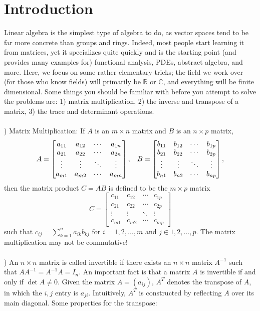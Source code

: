 \documentclass{article}
\theoremstyle{definition}
\theoremstyle{remark}
\begin{document}
\section{Introduction}
\indent Linear algebra is the simplest type of algebra to do, as vector spaces tend to be far more concrete than groups and rings. Indeed, most people start learning it from matrices, yet it specializes quite quickly and is the starting point (and provides many examples for) functional analysis, PDEs, abstract algebra, and more. Here, we focus on some rather elementary tricks; the field we work over (for those who know fields) will primarily be $\mathbb{R}$ or $\mathbb{C}$, and everything will be finite dimensional. Some things you should be familiar with before you attempt to solve the problems are: 1) matrix multiplication, 2) the inverse and transpose of a matrix, 3) the trace and determinant operations. \\
\\
) Matrix Multiplication: If $A$ is an $m \times n$ matrix and $B$ is an $n \times p$ matrix,  
\[A = \begin{bmatrix}
a_{11}&a_{12}&\cdots&a_{1n}\\
a_{21}&a_{22}&\cdots&a_{2n}\\
\vdots&\vdots&\ddots&\vdots\\
a_{m1}&a_{m2}&\cdots&a_{mn}
\end{bmatrix}, \hspace*{3mm} B = \begin{bmatrix}
b_{11}&b_{12}&\cdots&b_{1p}\\
b_{21}&b_{22}&\cdots&b_{2p}\\
\vdots&\vdots&\ddots&\vdots\\
b_{n1}&b_{n2}&\cdots&b_{np}
\end{bmatrix},
\]
then the matrix product $C = AB$ is defined to be the $m \times p$ matrix 
\[C = \begin{bmatrix}
c_{11}&c_{12}&\cdots&c_{1p}\\
c_{21}&c_{22}&\cdots&c_{2p}\\
\vdots&\vdots&\ddots&\vdots\\
c_{m1}&c_{m2}&\cdots&c_{mp}
\end{bmatrix}
\]
such that $c_{ij} = \sum_{k = 1}^{n} a_{ik}b_{kj}$ for $i = 1, 2, \ldots, m$ and $j \in 1, 2, \ldots, p$. The matrix multiplication may not be commutative!\\
\\
) An $n \times n$ matrix is called invertible if there exists an $n \times n$ matrix $A^{
-1}$ such that $A A^{-1} = A^{-1} A = I_{n}$. An important fact is that a matrix $A$ is invertible if and only if $\det{A} \neq 0$. Given the matrix $A = (a_{ij})$, $A^{T}$ denotes the transpose of $A$, in which the $i, j$ entry is $a_{ji}$. Intuitively, $A^{T}$ is constructed by reflecting $A$ over its main diagonal. Some properties for the transpose: 
\end{document}
